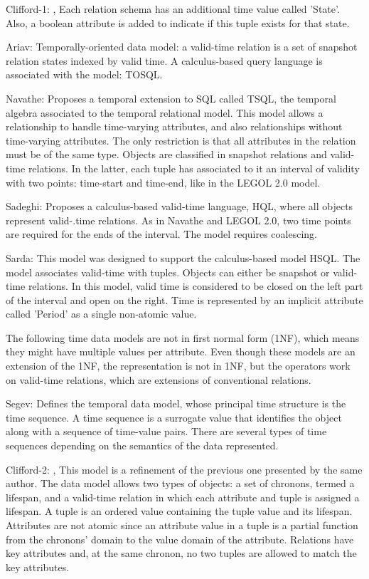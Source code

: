 Clifford-1: \cite{Clifford82},\cite{Clifford:1983:FST:319983.319986} Each relation schema has an additional time value called 'State'. Also, a boolean attribute is added to indicate if this tuple exists for that state.

Ariav: \cite{Ariav:1986:TOD:7239.7350} Temporally-oriented data model: a valid-time relation is a set of snapshot relation states indexed by valid time. A calculus-based query language is associated with the model: TOSQL.

Navathe: \cite{TSQL} Proposes a temporal extension to SQL called TSQL, the temporal algebra associated to the temporal relational model. This model allows a relationship to handle time-varying attributes, and also relationships without time-varying attributes. The only restriction is that all attributes in the relation must be of the same type. Objects are classified in snapshot relations and valid-time relations. In the latter, each tuple has associated to it an interval of validity with two points: time-start and time-end, like in the LEGOL 2.0 model.

Sadeghi: \cite{913787} Proposes a calculus-based valid-time language, HQL, where all objects represent valid-.time relations. As in Navathe and LEGOL 2.0, two time points are required for the ends of the interval. The model requires coalescing.

Sarda: \cite{Sarda:1990:ESH:627277.627409} This model was designed to support the calculus-based model HSQL. The model associates valid-time with tuples. Objects can either be snapshot or valid-time relations. In this model, valid time is considered to be closed on the left part of the interval and open on the right. Time is represented by an implicit attribute called 'Period' as a single non-atomic value.

The following time data models are not in first normal form (1NF), which means they might have multiple values per attribute. Even though these models are an extension of the 1NF, the representation is not in 1NF, but the operators work on valid-time relations, which are extensions of conventional relations.

Segev: \cite{Segev:1987:LMT:38714.38760} Defines the temporal data model, whose principal time structure is the time sequence. A time sequence is a surrogate value that identifies the object along with a sequence of time-value pairs. There are several types of time sequences depending on the semantics of the data represented. 

Clifford-2: \cite{Clifford:1987:HRD:645472.653241},\cite{Clifford:1985:AHR:971699.318922} This model is a refinement of the previous one presented by the same author. The data model allows two types of objects: a set of chronons, termed a lifespan, and a valid-time relation in which each attribute and tuple is assigned a lifespan. A tuple is an ordered value containing the tuple value and its lifespan. Attributes are not atomic since an attribute value in a tuple is a partial function from the chronons' domain to the value domain of the attribute. Relations have key attributes and, at the same chronon, no two tuples are allowed to match the key attributes.


